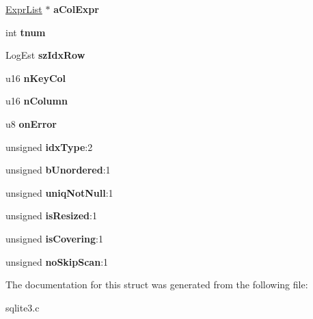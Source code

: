 \begin{DoxyCompactItemize}
\item 
\hyperlink{structExprList}{Expr\+List} $\ast$ {\bfseries a\+Col\+Expr}\hypertarget{structIndex_ad56e9619762ce33f1a9cd96affc0d3d4}{}\label{structIndex_ad56e9619762ce33f1a9cd96affc0d3d4}

\item 
int {\bfseries tnum}\hypertarget{structIndex_af895a09c01701021c3e36362c04a1ae6}{}\label{structIndex_af895a09c01701021c3e36362c04a1ae6}

\item 
Log\+Est {\bfseries sz\+Idx\+Row}\hypertarget{structIndex_a9048746be17e02ffb3ac6d6a228e4a62}{}\label{structIndex_a9048746be17e02ffb3ac6d6a228e4a62}

\item 
u16 {\bfseries n\+Key\+Col}\hypertarget{structIndex_acfd52a6b0c7be163dcaf524574f69331}{}\label{structIndex_acfd52a6b0c7be163dcaf524574f69331}

\item 
u16 {\bfseries n\+Column}\hypertarget{structIndex_ab0e748636131297b5243e61ee9a8042c}{}\label{structIndex_ab0e748636131297b5243e61ee9a8042c}

\item 
u8 {\bfseries on\+Error}\hypertarget{structIndex_ae8bf87d0414e5c46b86192cfbdd271a7}{}\label{structIndex_ae8bf87d0414e5c46b86192cfbdd271a7}

\item 
unsigned {\bfseries idx\+Type}\+:2\hypertarget{structIndex_aebd62422c514bd90aab41606bec71032}{}\label{structIndex_aebd62422c514bd90aab41606bec71032}

\item 
unsigned {\bfseries b\+Unordered}\+:1\hypertarget{structIndex_ae96b00c29b348bce9d58a5073fdb6d3e}{}\label{structIndex_ae96b00c29b348bce9d58a5073fdb6d3e}

\item 
unsigned {\bfseries uniq\+Not\+Null}\+:1\hypertarget{structIndex_a541590f6cf6c45705b3ef19fdce091ca}{}\label{structIndex_a541590f6cf6c45705b3ef19fdce091ca}

\item 
unsigned {\bfseries is\+Resized}\+:1\hypertarget{structIndex_ad9c4a83513b3cf885782dcd459ed061f}{}\label{structIndex_ad9c4a83513b3cf885782dcd459ed061f}

\item 
unsigned {\bfseries is\+Covering}\+:1\hypertarget{structIndex_ac4151fa2557d26d7c538f25a03d0b44e}{}\label{structIndex_ac4151fa2557d26d7c538f25a03d0b44e}

\item 
unsigned {\bfseries no\+Skip\+Scan}\+:1\hypertarget{structIndex_a7704321883c8b38e6dcca88b5886d4ee}{}\label{structIndex_a7704321883c8b38e6dcca88b5886d4ee}

\end{DoxyCompactItemize}


The documentation for this struct was generated from the following file\+:\begin{DoxyCompactItemize}
\item 
sqlite3.\+c\end{DoxyCompactItemize}
